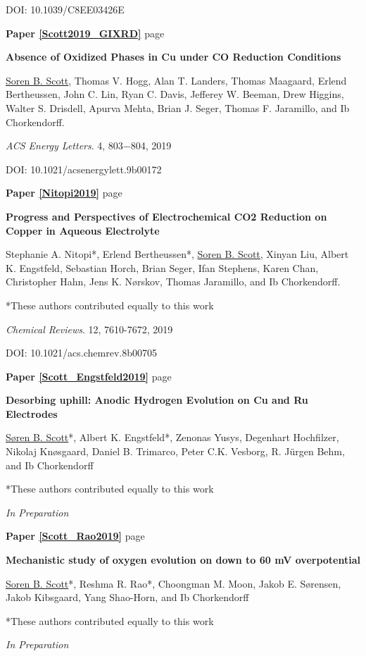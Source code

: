 \begin{flushleft}
DOI:  10.1039/C8EE03426E


\vspace{5mm}
\noindent\textbf{Paper \ref{Scott2019_GIXRD}} \hfill page~\pageref{Scott2019_GIXRD}

\textbf{Absence of Oxidized Phases in Cu under CO Reduction Conditions} 

\underline{Soren B. Scott}, Thomas V. Hogg, Alan T. Landers, Thomas Maagaard, Erlend Bertheussen, John C. Lin, Ryan C. Davis, Jefferey W. Beeman, Drew Higgins, Walter S. Drisdell, Apurva Mehta, Brian J. Seger, Thomas F. Jaramillo, and Ib Chorkendorff.

\textit{ACS Energy Letters}. 4, 803−804, 2019

DOI: 10.1021/acsenergylett.9b00172


\vspace{5mm}
\noindent\textbf{Paper \ref{Nitopi2019}} \hfill page~\pageref{Nitopi2019}

\textbf{Progress and Perspectives of Electrochemical CO2 Reduction on Copper in Aqueous Electrolyte} 

Stephanie A. Nitopi*, Erlend Bertheussen*, \underline{Soren B. Scott}, Xinyan Liu, Albert K. Engstfeld, Sebastian Horch, Brian Seger, Ifan Stephens, Karen Chan, Christopher Hahn, Jens K. Nørskov, Thomas Jaramillo, and Ib Chorkendorff.

*These authors contributed equally to this work

\textit{Chemical Reviews}. 12, 7610-7672, 2019

DOI: 10.1021/acs.chemrev.8b00705



\vspace{5mm}

\noindent\textbf{Paper \ref{Scott_Engstfeld2019}} \hfill page~\pageref{Scott_Engstfeld2019}
	
\textbf{Desorbing uphill: Anodic Hydrogen Evolution on Cu and Ru Electrodes} 

\underline{Søren B. Scott}*, Albert K. Engstfeld*, Zenonas Yusys, Degenhart Hochfilzer, Nikolaj Knøsgaard, Daniel B. Trimarco, Peter C.K. Vesborg, R. Jürgen Behm, and Ib Chorkendorff

*These authors contributed equally to this work

\textit{In Preparation}


\vspace{5mm}
\noindent\textbf{Paper \ref{Scott_Rao2019}} \hfill page~\pageref{Scott_Rao2019}

\textbf{Mechanistic study of oxygen evolution on  down to 60 mV overpotential}

\underline{Soren B. Scott}*, Reshma R. Rao*, Choongman M. Moon, Jakob E. S\o rensen, Jakob Kibsgaard, Yang Shao-Horn, and Ib Chorkendorff

*These authors contributed equally to this work

\textit{In Preparation}



\end{flushleft}